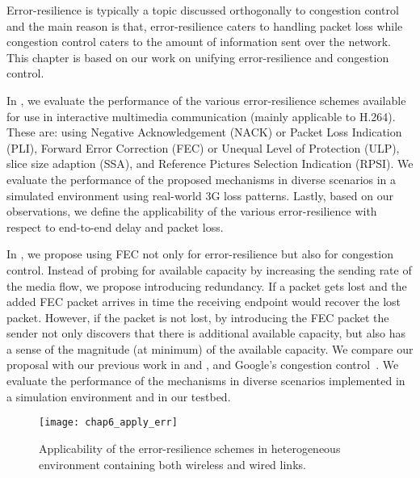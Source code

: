 Error-resilience is typically a topic discussed orthogonally to congestion
control and the main reason is that, error-resilience caters to handling
packet loss while congestion control caters to the amount of information sent
over the network. This chapter is based on our work on unifying
error-resilience and congestion control.

In , we evaluate the performance of the various
error-resilience schemes available for use in interactive multimedia
communication (mainly applicable to H.264). These are: using Negative
Acknowledgement (NACK) or Packet Loss Indication (PLI), Forward Error
Correction (FEC) or Unequal Level of Protection (ULP), slice size adaption
(SSA), and Reference Pictures Selection Indication (RPSI). We evaluate the
performance of the proposed mechanisms in diverse scenarios in a simulated
environment using real-world 3G loss patterns. Lastly, based on our
observations, we define the applicability of the various error-resilience with
respect to end-to-end delay and packet loss.

In , we propose using FEC not only for error-resilience but
also for congestion control. Instead of probing for available capacity by
increasing the sending rate of the media flow, we propose introducing
redundancy. If a packet gets lost and the added FEC packet arrives in time the
receiving endpoint would recover the lost packet. However, if the packet is
not lost, by introducing the FEC packet the sender not only discovers that
there is additional available capacity, but also has a sense of the magnitude
(at minimum) of the available capacity. We compare our proposal with our
previous work in  and , and Google's
congestion control~\cite{draft.rrtcc}. We evaluate the performance of the
mechanisms in diverse scenarios implemented in a simulation environment and in
our testbed.

\begin{figure}
\centerline {
\texttt{[image: chap6\_apply\_err]}
}
\caption{Applicability of the error-resilience schemes in heterogeneous
environment containing both wireless and wired links.}
\label{chap6:fig_err}
\end{figure}